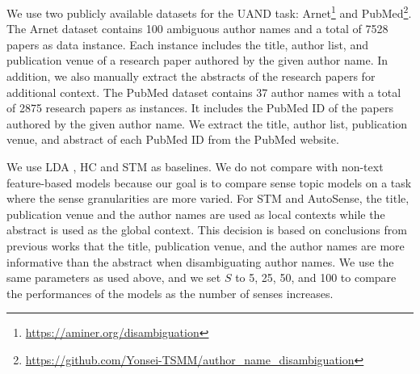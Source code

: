 \documentclass[letterpaper]{article}
\begin{document}
We use two publicly available datasets for the UAND task: Arnet\footnote{\url{https://aminer.org/disambiguation}} and PubMed\footnote{\url{https://github.com/Yonsei-TSMM/author_name_disambiguation}}. The Arnet dataset contains 100 ambiguous author names and a total of 7528 papers as data instance. Each instance includes the title, author list, and publication venue of a research paper authored by the given author name. In addition, we also manually extract the abstracts of the research papers for additional context.
The PubMed dataset contains 37 author names with a total of 2875 research papers as instances. It includes the PubMed ID of the papers authored by the given author name. We extract the title, author list, publication venue, and abstract of each PubMed ID from the PubMed website.

We use LDA \cite{blei2003latent}, HC \cite{chang2014inducing} and STM \cite{wang2015sense} as baselines. We do not compare with non-text feature-based models \cite{tang2012unified,cen2013author} because our goal is to compare sense topic models on a task where the sense granularities are more varied. For STM and AutoSense, the title, publication venue and the author names are used as local contexts while the abstract is used as the global context. This decision is based on conclusions from previous works \cite{tang2012unified} that the title, publication venue, and the author names are more informative than the abstract when disambiguating author names. We use the same parameters as used above, and we set $S$ to 5, 25, 50, and 100 to compare the performances of the models as the number of senses increases.
\end{document}
